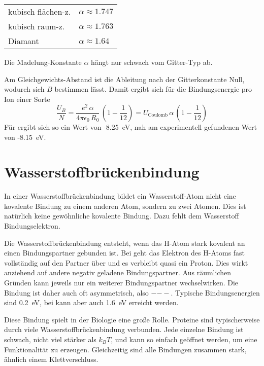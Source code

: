 \begin{marginfigure}

\begin{tabular}{ll}
kubisch flächen-z. & $\alpha \approx 1.747$ \\
kubisch raum-z. & $\alpha \approx 1.763$ \\
Diamant & $\alpha \approx 1.64$ \\
\end{tabular}
\caption{Die Madelung-Konstante $\alpha$ hängt nur schwach vom Gitter-Typ ab.}
\end{marginfigure}

Am Gleichgewichts-Abstand ist die Ableitung nach der Gitterkonstante Null, wodurch sich $B$ bestimmen lässt. Damit ergibt sich für die Bindungsenergie pro Ion einer Sorte
\begin{equation}
\frac{U_B}{N} = \frac{e^2 \, \alpha }{4 \pi \epsilon_0 \, R_0} \, \left( 1- \frac{1}{12} \right) = U_\text{Coulomb} \, \alpha \, \left( 1- \frac{1}{12} \right) 
\end{equation}
Für  ergibt sich so ein Wert von -8.25~eV, nah am experimentell gefundenen Wert von -8.15~eV.





\section{Wasserstoffbrückenbindung}

In einer Wasserstoffbrückenbindung bildet ein Wasserstoff-Atom nicht eine kovalente Bindung zu einem anderen Atom, sondern zu zwei Atomen. Dies ist natürlich keine gewöhnliche kovalente Bindung. Dazu fehlt dem Wasserstoff  Bindungselektron.

Die Wasserstoffbrückenbindung entsteht, wenn das H-Atom stark kovalent an einen Bindungspartner gebunden ist. Bei geht das Elektron des H-Atoms fast vollständig auf den Partner über und es verbleibt quasi ein Proton. Dies wirkt anziehend auf andere negativ geladene Bindungspartner. Aus räumlichen Gründen kann jeweils nur ein weiterer Bindungspartner wechselwirken. Die Bindung ist daher auch oft asymmetrisch, also $-$$--$. Typische Bindungsenergien sind 0.2~eV, bei  kann aber auch 1.6~eV erreicht werden.

Diese Bindung spielt in der Biologie eine große Rolle. Proteine sind typischerweise durch viele Wasserstoffbrückenbindung verbunden. Jede einzelne Bindung ist schwach, nicht viel stärker als $k_B T$, und kann so einfach geöffnet werden, um eine Funktionalität zu erzeugen. Gleichzeitig sind alle Bindungen zusammen stark, ähnlich einem Klettverschluss.









\printbibliography[segment=\therefsegment,heading=subbibliography]
